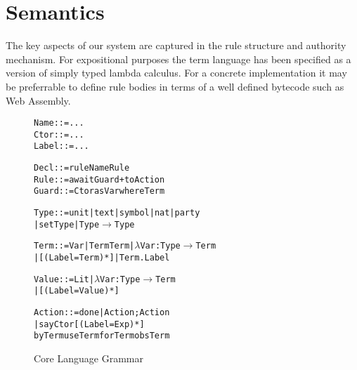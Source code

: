 
\clearpage{}
\section{Semantics}
The key aspects of our system are captured in the rule structure and authority mechanism. For expositional purposes the term language has been specified as a version of simply typed lambda calculus. For a concrete implementation it may be preferrable to define rule bodies in terms of a well defined bytecode such as Web Assembly. 



\begin{figure}
\begin{small}
\begin{alltt}
Name   ::= ...
Ctor   ::= ...
Label  ::= ...

Decl   ::= rule Name Rule
Rule   ::= await Guard+ to Action
Guard  ::= Ctor as Var where Term

Type   ::= unit | text | symbol | nat | party
        |  set Type | Type \(\to\) Type

Term   ::= Var | Term Term | \(\lambda\) Var : Type \(\to\) Term
        |  [ (Label = Term)* ] | Term . Label

Value  ::= Lit | \(\lambda\) Var : Type \(\to\) Term
        |  [ (Label = Value)* ]

Action ::= done | Action ; Action
        |  say Ctor [ (Label = Exp)* ]
           by  Term  use Term  for Term  obs Term
\end{alltt}
\end{small}

\caption{Core Language Grammar}
\end{figure}



